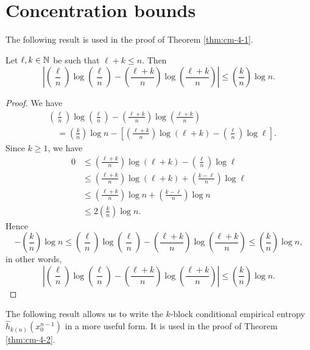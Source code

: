 \section{Concentration bounds}

The following result is used in the proof of Theorem \ref{thm:cm-4-1}.

\begin{proposition}\label{prop:logs-thm-4-1}
	Let $\ell, k \in \mathbb{N}$ be such that $\ell + k \leq n$. Then
	\[
		\left|\left(\frac{\ell}{n}\right)\log\left(\frac{\ell}{n}\right) - \left(\frac{\ell + k}{n}\right)\log\left(\frac{\ell + k}{n}\right)\right| \leq \left(\frac{k}{n}\right)\log{n}.
	\]
	
	\begin{proof}
		We have
		\begin{align*}
			&\left(\frac{\ell}{n}\right)\log\left(\frac{\ell}{n}\right) - \left(\frac{\ell + k}{n}\right)\log\left(\frac{\ell + k}{n}\right) \\
				&\quad = \left(\frac{k}{n}\right)\log{n} - \left[\left(\frac{\ell + k}{n}\right)\log(\ell + k) - \left(\frac{\ell}{n}\right)\log{\ell}\right].
		\end{align*}
		Since $k \geq 1$, we have
		\begin{align*}
			0 &\leq \left(\frac{\ell + k}{n}\right)\log(\ell + k) - \left(\frac{\ell}{n}\right)\log{\ell} \\
				&\leq \left(\frac{\ell + k}{n}\right)\log(\ell + k) + \left(\frac{k - \ell}{n}\right)\log{\ell} \\
				&\leq \left(\frac{\ell + k}{n}\right)\log{n} + \left(\frac{k - \ell}{n}\right)\log{n} \\
				&\leq 2\left(\frac{k}{n}\right)\log{n}.
		\end{align*}
		Hence
		\[
			-\left(\frac{k}{n}\right)\log{n} \leq \left(\frac{\ell}{n}\right)\log\left(\frac{\ell}{n}\right) - \left(\frac{\ell + k}{n}\right)\log\left(\frac{\ell + k}{n}\right) \leq \left(\frac{k}{n}\right)\log{n},
		\]
		in other words,
		\[
			\left|\left(\frac{\ell}{n}\right)\log\left(\frac{\ell}{n}\right) - \left(\frac{\ell + k}{n}\right)\log\left(\frac{\ell + k}{n}\right)\right| \leq \left(\frac{k}{n}\right)\log{n}.
		\]
	\end{proof}
\end{proposition}

The following result allows us to write the $k$-block conditional empirical entropy $\hat{h}_{k(n)}(x_0^{n - 1})$ in a more useful form. It is used in the proof of Theorem \ref{thm:cm-4-2}.

